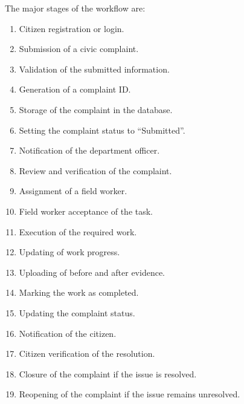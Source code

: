 \documentclass[12pt,a4paper]{article}
\begin{document}
The major stages of the workflow are:

\begin{enumerate}[leftmargin=*]

\item Citizen registration or login.

\item Submission of a civic complaint.

\item Validation of the submitted information.

\item Generation of a complaint ID.

\item Storage of the complaint in the database.

\item Setting the complaint status to ``Submitted''.

\item Notification of the department officer.

\item Review and verification of the complaint.

\item Assignment of a field worker.

\item Field worker acceptance of the task.

\item Execution of the required work.

\item Updating of work progress.

\item Uploading of before and after evidence.

\item Marking the work as completed.

\item Updating the complaint status.

\item Notification of the citizen.

\item Citizen verification of the resolution.

\item Closure of the complaint if the issue is resolved.

\item Reopening of the complaint if the issue remains unresolved.

\end{enumerate}
\end{document}
